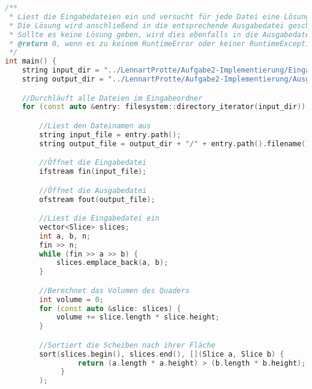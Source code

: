 \documentclass[a4paper,10pt,ngerman]{scrartcl}
\begin{document}
    \begin{lstlisting}[frame=single,language=C++,title=Methode main,breaklines=true,label={lst:code_main_extended}]
/**
 * Liest die Eingabedateien ein und versucht für jede Datei eine Lösung entsprechend der Aufgabenstellung zu finden
 * Die Lösung wird anschließend in die entsprechende Ausgabedatei geschrieben
 * Sollte es keine Lösung geben, wird dies ebenfalls in die Ausgabedatei geschrieben
 * @return 0, wenn es zu keinem RuntimeError oder keiner RuntimeException gekommen ist
 */
int main() {
    string input_dir = "../LennartProtte/Aufgabe2-Implementierung/Eingabedateien_b";
    string output_dir = "../LennartProtte/Aufgabe2-Implementierung/Ausgabedateien_b";

    //Durchläuft alle Dateien im Eingabeordner
    for (const auto &entry: filesystem::directory_iterator(input_dir)) {

        //Liest den Dateinamen aus
        string input_file = entry.path();
        string output_file = output_dir + "/" + entry.path().filename().string();

        //Öffnet die Eingabedatei
        ifstream fin(input_file);

        //Öffnet die Ausgabedatei
        ofstream fout(output_file);

        //Liest die Eingabedatei ein
        vector<Slice> slices;
        int a, b, n;
        fin >> n;
        while (fin >> a >> b) {
            slices.emplace_back(a, b);
        }

        //Berechnet das Volumen des Quaders
        int volume = 0;
        for (const auto &slice: slices) {
            volume += slice.length * slice.height;
        }

        //Sortiert die Scheiben nach ihrer Fläche
        sort(slices.begin(), slices.end(), [](Slice a, Slice b) {
                 return (a.length * a.height) > (b.length * b.height);
             }
        );


\end{lstlisting}
\end{document}

